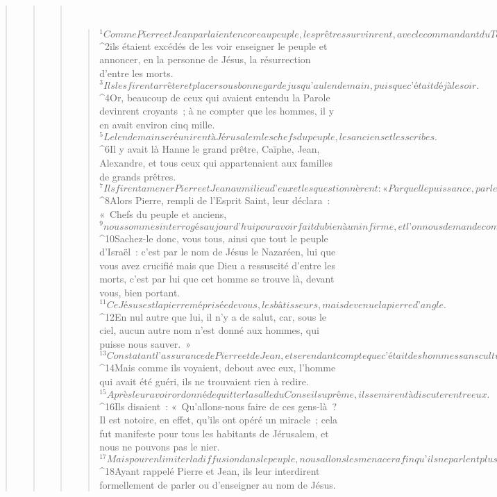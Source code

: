 \begin{verse}
\begin{verse}
\begin{verse}
         
      \bchapter{}
      \begin{verse}
${}^{1}Comme Pierre et Jean parlaient encore au peuple, les prêtres survinrent, avec le commandant du Temple et les sadducéens ; 
${}^{2}ils étaient excédés de les voir enseigner le peuple et annoncer, en la personne de Jésus, la résurrection d’entre les morts. 
${}^{3}Ils les firent arrêter et placer sous bonne garde jusqu’au lendemain, puisque c’était déjà le soir. 
${}^{4}Or, beaucoup de ceux qui avaient entendu la Parole devinrent croyants ; à ne compter que les hommes, il y en avait environ cinq mille.
${}^{5}Le lendemain se réunirent à Jérusalem les chefs du peuple, les anciens et les scribes. 
${}^{6}Il y avait là Hanne le grand prêtre, Caïphe, Jean, Alexandre, et tous ceux qui appartenaient aux familles de grands prêtres. 
${}^{7}Ils firent amener Pierre et Jean au milieu d’eux et les questionnèrent : « Par quelle puissance, par le nom de qui, avez-vous fait cette guérison ? »
${}^{8}Alors Pierre, rempli de l’Esprit Saint, leur déclara : « Chefs du peuple et anciens, 
${}^{9}nous sommes interrogés aujourd’hui pour avoir fait du bien à un infirme, et l’on nous demande comment cet homme a été sauvé. 
${}^{10}Sachez-le donc, vous tous, ainsi que tout le peuple d’Israël : c’est par le nom de Jésus le Nazaréen, lui que vous avez crucifié mais que Dieu a ressuscité d’entre les morts, c’est par lui que cet homme se trouve là, devant vous, bien portant. 
${}^{11}Ce Jésus est la pierre méprisée de vous, les bâtisseurs, mais devenue la pierre d’angle. 
${}^{12}En nul autre que lui, il n’y a de salut, car, sous le ciel, aucun autre nom n’est donné aux hommes, qui puisse nous sauver. »
${}^{13}Constatant l’assurance de Pierre et de Jean, et se rendant compte que c’était des hommes sans culture et de simples particuliers, ils étaient surpris ; d’autre part, ils reconnaissaient en eux ceux qui étaient avec Jésus. 
${}^{14}Mais comme ils voyaient, debout avec eux, l’homme qui avait été guéri, ils ne trouvaient rien à redire. 
${}^{15}Après leur avoir ordonné de quitter la salle du Conseil suprême, ils se mirent à discuter entre eux. 
${}^{16}Ils disaient : « Qu’allons-nous faire de ces gens-là ? Il est notoire, en effet, qu’ils ont opéré un miracle ; cela fut manifeste pour tous les habitants de Jérusalem, et nous ne pouvons pas le nier. 
${}^{17}Mais pour en limiter la diffusion dans le peuple, nous allons les menacer afin qu’ils ne parlent plus à personne en ce nom-là. »
${}^{18}Ayant rappelé Pierre et Jean, ils leur interdirent formellement de parler ou d’enseigner au nom de Jésus. 

\end{verse}
\end{verse}
\end{verse}
\end{verse}
